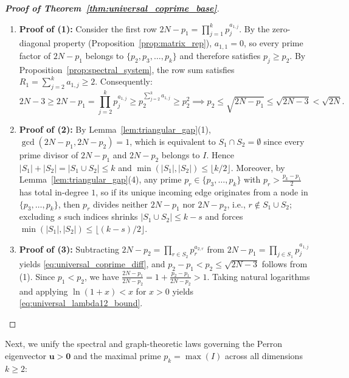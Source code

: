 \documentclass[11pt,a4paper]{article}
\theoremstyle{definition}
\begin{document}
\begin{proof}[\textbf{Proof of Theorem~\ref{thm:universal_coprime_base}}]
\begin{enumerate}
    \item \textbf{Proof of (1):} Consider the first row $2N - p_1 = \prod_{j=1}^k p_j^{a_{1,j}}$. By the zero-diagonal property (Proposition~\ref{prop:matrix_rep}), $a_{1,1} = 0$, so every prime factor of $2N - p_1$ belongs to $\{p_2, p_3, \dots, p_k\}$ and therefore satisfies $p_j \ge p_2$. By Proposition~\ref{prop:spectral_system}, the row sum satisfies $R_1 = \sum_{j=2}^k a_{1,j} \ge 2$. Consequently:
    \[
    2N - 3 \ge 2N - p_1 = \prod_{j=2}^k p_j^{a_{1,j}} \ge p_2^{\sum_{j=2}^k a_{1,j}} \ge p_2^2 \implies p_2 \le \sqrt{2N - p_1} \le \sqrt{2N - 3} < \sqrt{2N}.
    \]
    \item \textbf{Proof of (2):} By Lemma~\ref{lem:triangular_gap}(1), $\gcd(2N - p_1, 2N - p_2) = 1$, which is equivalent to $S_1 \cap S_2 = \emptyset$ since every prime divisor of $2N - p_1$ and $2N - p_2$ belongs to $I$. Hence $|S_1| + |S_2| = |S_1 \cup S_2| \le k$ and $\min(|S_1|, |S_2|) \le \lfloor k/2 \rfloor$. Moreover, by Lemma~\ref{lem:triangular_gap}(4), any prime $p_r \in \{p_3, \dots, p_k\}$ with $p_r > \frac{p_k - p_1}{2}$ has total in-degree $1$, so if its unique incoming edge originates from a node in $\{p_3, \dots, p_k\}$, then $p_r$ divides neither $2N - p_1$ nor $2N - p_2$, i.e., $r \notin S_1 \cup S_2$; excluding $s$ such indices shrinks $|S_1 \cup S_2| \le k - s$ and forces $\min(|S_1|, |S_2|) \le \lfloor (k - s)/2 \rfloor$.
    \item \textbf{Proof of (3):} Subtracting $2N - p_2 = \prod_{r \in S_2} p_r^{a_{2,r}}$ from $2N - p_1 = \prod_{j \in S_1} p_j^{a_{1,j}}$ yields \eqref{eq:universal_coprime_diff}, and $p_2 - p_1 < p_2 \le \sqrt{2N - 3}$ follows from (1). Since $p_1 < p_2$, we have $\frac{2N - p_1}{2N - p_2} = 1 + \frac{p_2 - p_1}{2N - p_2} > 1$. Taking natural logarithms and applying $\ln(1 + x) < x$ for $x > 0$ yields \eqref{eq:universal_lambda12_bound}.
\end{enumerate}
\end{proof}

Next, we unify the spectral and graph-theoretic laws governing the Perron eigenvector $\mathbf{u} > \mathbf{0}$ and the maximal prime $p_k = \max(I)$ across all dimensions $k \ge 2$:
\end{document}
